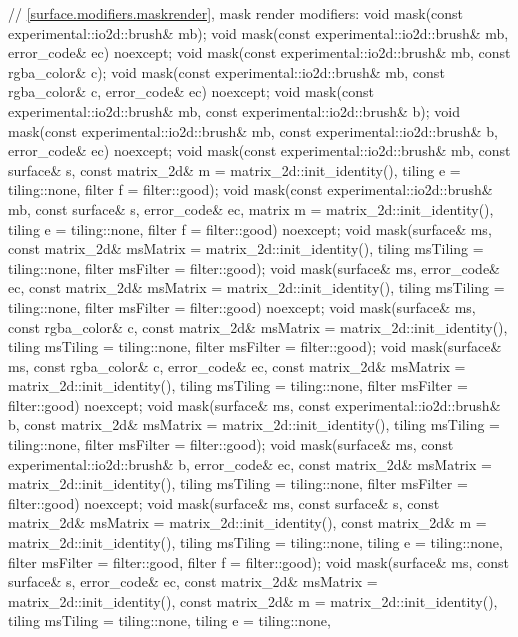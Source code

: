\begin{codeblock}
{{{{{    // \ref{surface.modifiers.maskrender}, mask render modifiers:
    void mask(const experimental::io2d::brush& mb);
    void mask(const experimental::io2d::brush& mb, error_code& ec)
      noexcept;
    void mask(const experimental::io2d::brush& mb, const rgba_color& c);
    void mask(const experimental::io2d::brush& mb, const rgba_color& c, 
      error_code& ec) noexcept;
    void mask(const experimental::io2d::brush& mb,
      const experimental::io2d::brush& b);
    void mask(const experimental::io2d::brush& mb,
      const experimental::io2d::brush& b, error_code& ec) noexcept;
    void mask(const experimental::io2d::brush& mb, const surface& s,
      const matrix_2d& m = matrix_2d::init_identity(), tiling e = tiling::none, 
      filter f = filter::good);
    void mask(const experimental::io2d::brush& mb, const surface& s,
      error_code& ec, matrix m = matrix_2d::init_identity(),
      tiling e = tiling::none, filter f = filter::good) noexcept;
    void mask(surface& ms,
      const matrix_2d& msMatrix = matrix_2d::init_identity(),
      tiling msTiling = tiling::none, filter msFilter = filter::good);
    void mask(surface& ms, error_code& ec, 
      const matrix_2d& msMatrix = matrix_2d::init_identity(),
      tiling msTiling = tiling::none, filter msFilter = filter::good) noexcept;
    void mask(surface& ms, const rgba_color& c,
      const matrix_2d& msMatrix = matrix_2d::init_identity(),
      tiling msTiling = tiling::none, filter msFilter = filter::good);
    void mask(surface& ms, const rgba_color& c, error_code& ec, 
      const matrix_2d& msMatrix = matrix_2d::init_identity(),
      tiling msTiling = tiling::none, filter msFilter = filter::good) noexcept;
    void mask(surface& ms, const experimental::io2d::brush& b, 
      const matrix_2d& msMatrix = matrix_2d::init_identity(),
      tiling msTiling = tiling::none, filter msFilter = filter::good);
    void mask(surface& ms, const experimental::io2d::brush& b, error_code& ec,
      const matrix_2d& msMatrix = matrix_2d::init_identity(),
      tiling msTiling = tiling::none, filter msFilter = filter::good) noexcept;
    void mask(surface& ms, const surface& s,
      const matrix_2d& msMatrix = matrix_2d::init_identity(),
      const matrix_2d& m = matrix_2d::init_identity(),
      tiling msTiling = tiling::none, tiling e = tiling::none,
      filter msFilter = filter::good, filter f = filter::good);
    void mask(surface& ms, const surface& s, error_code& ec,
      const matrix_2d& msMatrix = matrix_2d::init_identity(),
      const matrix_2d& m = matrix_2d::init_identity(),
      tiling msTiling = tiling::none, tiling e = tiling::none,
}}}}}
\end{codeblock}
